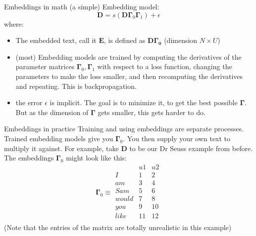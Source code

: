 \documentclass[10pt]{beamer}
\begin{document}
\begin{frame}{Embeddings in math}
(a simple) Embedding model:
\[
\bm{D} = s\left(\bm{D\Gamma}_0\bm{\Gamma}_1\right) + \epsilon
\]
where:
\begin{itemize}
\item The embedded text, call it $\bm{E}$, is defined as $\bm{D\Gamma_0}$ (dimension $N \times U$)
\item (most) Embedding models are trained by computing the derivatives of the parameter matrices $\bm{\Gamma}_0, \bm{\Gamma}_1$ with respect to a loss function, changing the parameters to make the loss smaller, and then recomputing the derivatives and repeating.  This is backpropagation.
\item the error $\epsilon$ is implicit.  The goal is to minimize it, to get the best possible $\bm{\Gamma}$.  But as the dimension of $\bm{\Gamma}$ gets smaller, this gets harder to do.
\end{itemize}
\end{frame}

\begin{frame}{Embeddings in practice}
Training and using embeddings are separate processes.  Trained embedding models give you $\bm{\Gamma}_0$.  You then supply your own text to multiply it against.  For example, take $\bm{D}$ to be our Dr Seuss example from before.  The embeddings $\bm\Gamma_0$ might look like this:
\[  \bm{\Gamma}_0 \equiv
\begin{array}{c|cccccc}
     & u1 & u2 \\
     \hline
I    & 1 & 2 \\
am   & 3 & 4  \\
Sam  & 5 & 6   \\
would& 7 & 8  \\
you  & 9 & 10  \\
like & 11 & 12  \\
\end{array}\] 
(Note that the entries of the matrix are totally unrealistic in this example)

\end{frame}
\end{document}
